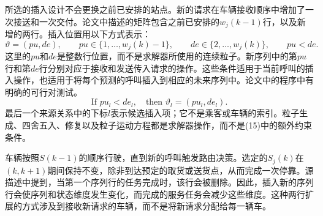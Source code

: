 \documentclass[11pt]{article}
\begin{document}
所选的插入设计不会更换之前已安排的站点。新的请求在车辆接收顺序中增加了一次接送和一次交付。论文中描述的矩阵包含之前已安排的$w_j(k-1)$行，以及新增的两行。插入位置用以下方式表示：
\[
\vartheta=(pu,de),
\qquad
pu\in\{1,\ldots,w_j(k)-1\},
\qquad
de\in\{2,\ldots,w_j(k)\},
\qquad pu<de.
\]
这里的$pu$和$de$是整数行位置，而不是求解器所使用的连续粒子。新序列中的第$pu$行和第$de$行分别对应于接收和发送传入请求的操作。这些条件适用于当前呼叫的插入操作，也适用于将每个预测的呼叫插入到相应的未来序列中。论文中的程序中有明确的可行对测试。
\[
\text{If }pu_l<de_l,\quad\text{then }\vartheta_l=(pu_l,de_l).
\]
最后一个来源关系中的下标$l$表示候选插入项；它不是乘客或车辆的索引。粒子生成、四舍五入、修复以及粒子运动方程都是求解器操作，而不是(15)中的额外约束条件。

车辆按照$S(k-1)$的顺序行驶，直到新的呼叫触发路由决策。选定的$S_j(k)$在$(k,k+1)$期间保持不变，除非到达预定的取货或送货点，从而完成一次停靠。源描述中提到，当第一个序列行的任务完成时，该行会被删除。因此，插入新的序列行会使序列和状态维度发生变化，而完成的服务任务会减少这些维度。这种两行扩展的方式涉及到接收新请求的车辆，而不是将新请求分配给每一辆车。
\end{document}
